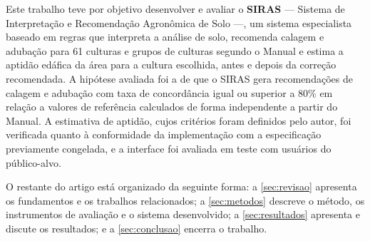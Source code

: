 Este trabalho teve por objetivo desenvolver e avaliar o \textbf{SIRAS} --- Sistema de
Interpretação e Recomendação Agronômica de Solo ---, um sistema especialista baseado em regras
que interpreta a análise de solo, recomenda calagem e adubação para 61 culturas e grupos de
culturas segundo o Manual \citep{ManualCalagem2016} e estima a aptidão edáfica da área para a
cultura escolhida, antes e depois da correção recomendada. A hipótese avaliada foi a de que o
SIRAS gera recomendações de calagem e adubação com taxa de concordância igual ou superior a
80\% em relação a valores de referência calculados de forma independente a partir do Manual.
A estimativa de aptidão, cujos critérios foram definidos pelo autor, foi verificada quanto à
conformidade da implementação com a especificação previamente congelada, e a interface foi
avaliada em teste com usuários do público-alvo.

O restante do artigo está organizado da seguinte forma: a \autoref{sec:revisao} apresenta os
fundamentos e os trabalhos relacionados; a \autoref{sec:metodos} descreve o método, os
instrumentos de avaliação e o sistema desenvolvido; a \autoref{sec:resultados} apresenta e
discute os resultados; e a \autoref{sec:conclusao} encerra o trabalho.
